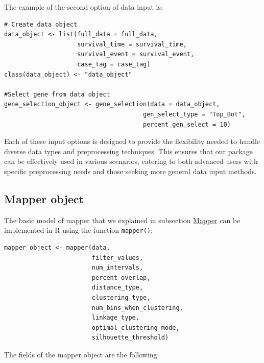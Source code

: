 The example of the second option of data input is:

\begin{verbatim}
# Create data object
data_object <- list(full_data = full_data,
                    survival_time = survival_time,
                    survival_event = survival_event,
                    case_tag = case_tag)
class(data_object) <- "data_object"

#Select gene from data object
gene_selection_object <- gene_selection(data = data_object, 
                                      gen_select_type = "Top_Bot",
                                      percent_gen_select = 10)
\end{verbatim}

Each of these input options is designed to provide the flexibility needed to handle diverse data types and preprocessing techniques. This ensures that our package can be effectively used in various scenarios, catering to both advanced users with specific preprocessing needs and those seeking more general data input methods.

\hypertarget{section4.3}{%
\subsection{Mapper object}\label{section4.3}}

The basic model of mapper that we explained in subsection \protect\hyperlink{section2.3}{Mapper} can be implemented in R using the function \texttt{mapper()}:

\begin{verbatim}
mapper_object <- mapper(data,
                        filter_values,
                        num_intervals,
                        percent_overlap,
                        distance_type,
                        clustering_type,
                        num_bins_when_clustering, 
                        linkage_type, 
                        optimal_clustering_mode, 
                        silhouette_threshold)
\end{verbatim}

The fields of the mapper object are the following:

